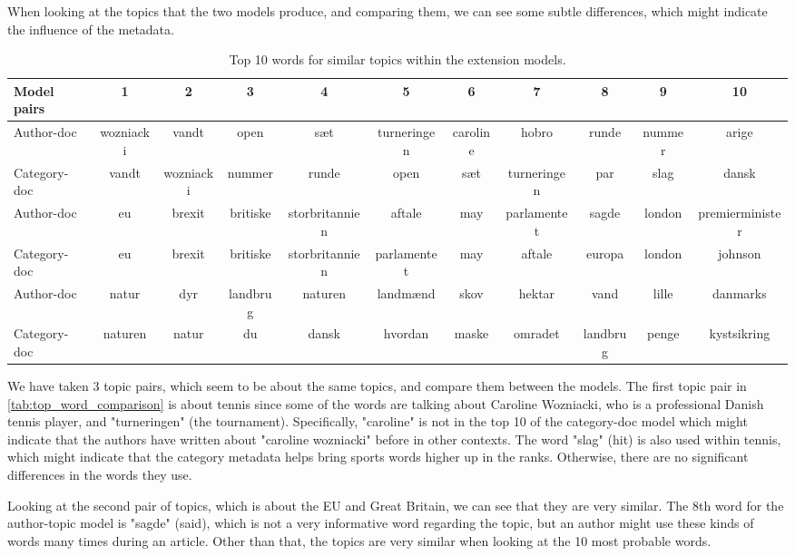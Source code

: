When looking at the topics that the two models produce, and comparing them, we can see some subtle differences, which might indicate the influence of the metadata.
\begin{table}
		\centering
	\caption{Top 10 words for similar topics within the extension models.}
	\begin{tabular}{l|c|c|c|c|c|c|c|c|c|c}
		Model pairs & 1 & 2 & 3 & 4 & 5 & 6 & 7 & 8 & 9 & 10 \\
		\midrule
		Author-doc & wozniacki & vandt & open & sæt & turneringen & caroline & hobro & runde & nummer & arige \\
		Category-doc & vandt & wozniacki & nummer & runde & open & sæt & turneringen & par & slag & dansk \\
		\midrule
		Author-doc & eu & brexit & britiske & storbritannien & aftale & may & parlamentet & sagde & london & premierminister \\
		Category-doc & eu & brexit & britiske & storbritannien & parlamentet & may & aftale & europa & london & johnson \\
		\midrule
		Author-doc & natur & dyr & landbrug & naturen & landmænd & skov & hektar & vand & lille & danmarks \\
		Category-doc & naturen & natur & du & dansk & hvordan & maske & omradet & landbrug & penge & kystsikring \\
	\end{tabular}
	\label{tab:top_word_comparison}
\end{table}
We have taken 3 topic pairs, which seem to be about the same topics, and compare them between the models.
The first topic pair in \autoref{tab:top_word_comparison} is about tennis since some of the words are talking about Caroline Wozniacki, who is a professional Danish tennis player, and "turneringen" (the tournament).
Specifically, "caroline" is not in the top 10 of the category-doc model which might indicate that the authors have written about "caroline wozniacki" before in other contexts.
The word "slag" (hit) is also used within tennis, which might indicate that the category metadata helps bring sports words higher up in the ranks.
Otherwise, there are no significant differences in the words they use.

Looking at the second pair of topics, which is about the EU and Great Britain, we can see that they are very similar.
The 8th word for the author-topic model is "sagde" (said), which is not a very informative word regarding the topic, but an author might use these kinds of words many times during an article.
Other than that, the topics are very similar when looking at the 10 most probable words.

